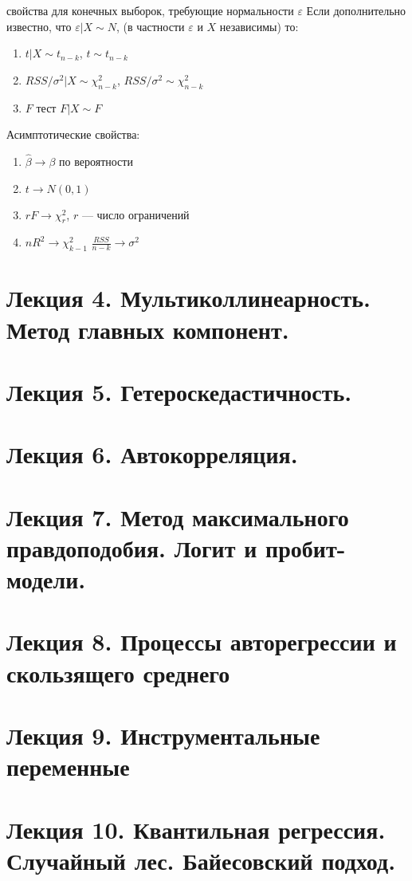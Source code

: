 \documentclass[]{article}
\begin{document}
свойства для конечных выборок, требующие нормальности $\varepsilon$ Если
дополнительно известно, что $\varepsilon |X \sim N$, (в частности
$\varepsilon$ и $X$ независимы) то:

\begin{enumerate}
\item $t|X \sim t_{n-k}$, $t\sim t_{n-k}$
\item  $RSS/\sigma^2 |X \sim \chi^2_{n-k}$, $RSS/\sigma^2 \sim \chi^2_{n-k}$
\item $F$ тест $F|X \sim F$
\end{enumerate}

Асимптотические свойства:

\begin{enumerate}
\item  $\hat{\beta} \to \beta$ по вероятности

\item $t \to N(0,1)$
\item  $rF \to \chi^2_r$, $r$ --- число ограничений
\item  $nR^2 \to \chi^2_{k-1}$
$\frac{RSS}{n-k} \to \sigma^2 $
\end{enumerate}

\section{Лекция 4. Мультиколлинеарность. Метод главных
компонент.}\label{-4.-.---.}

\section{Лекция 5. Гетероскедастичность.}\label{-5.-.}

\section{Лекция 6. Автокорреляция.}\label{-6.-.}

\section{Лекция 7. Метод максимального правдоподобия. Логит и
пробит-модели.}\label{-7.---.----.}

\section{Лекция 8. Процессы авторегрессии и скользящего
среднего}\label{-8.-----}

\section{Лекция 9. Инструментальные переменные}\label{-9.--}

\section{Лекция 10. Квантильная регрессия. Случайный лес. Байесовский
подход.}\label{-10.--.--.--.}
\end{document}
